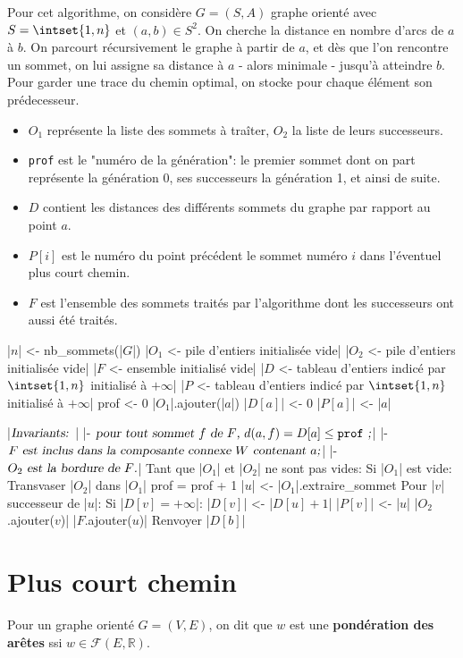 \documentclass{scrartcl}
\begin{document}
			Pour cet algorithme, on considère $G = (S,A)$ graphe orienté avec $S = \intset{1,n}$ et $(a,b)\in S^2$.
			On cherche la distance en nombre d'arcs de $a$ à $b$. 
			On parcourt récursivement le graphe à partir de $a$, et dès que l'on rencontre un sommet, 
			on lui assigne sa distance à $a$ - alors minimale - jusqu'à atteindre $b$.
			Pour garder une trace du chemin optimal, on stocke pour chaque élément son prédecesseur.
			\begin{itemize}
				\item $O_1$ représente la liste des sommets à traîter, $O_2$ la liste de leurs successeurs.
				\item \texttt{prof} est le "numéro de la génération": le premier sommet dont on part représente la génération 0,
				ses successeurs la génération 1, et ainsi de suite.
				\item $D$ contient les distances des différents sommets du graphe par rapport au point $a$.
				\item $P[i]$ est le numéro du point précédent le sommet numéro $i$ dans l'éventuel plus court chemin.
				\item $F$ est l'ensemble des sommets traités par l'algorithme dont les successeurs ont aussi été traités.
			\end{itemize}

			\begin{algotext}
				|$n$| <- nb_sommets(|$G$|)
				|$O_1$ <- pile d'entiers initialisée vide|
				|$O_2$ <- pile d'entiers initialisée vide|
				|$F$ <- ensemble initialisé vide|
				|$D$ <- tableau d'entiers indicé par $\intset{1,n}$ initialisé à $+\infty$|
				|$P$ <- tableau d'entiers indicé par $\intset{1,n}$ initialisé à $+\infty$|
				prof <- 0
				|$O_1$|.ajouter(|$a$|)	
				|$D[a]$| <- 0
				|$P[a]$| <- |$a$|

				|$\textsl{Invariants: }$|
					|- $ \textsl{pour tout sommet $f$ de $F$, $d(a,f) = D[a] \leq \mathtt{prof}$ ;}$|
					|- $ \textsl{$F$ est inclus dans la composante connexe $W$ contenant $a$;}$|
					|- $ \textsl{$O_2$ est la bordure de $F$.}$|
				Tant que |$O_1$| et |$O_2$| ne sont pas vides:
					Si |$O_1$| est vide:
						Transvaser |$O_2$| dans |$O_1$|
						prof = prof + 1
					|$u$| <- |$O_1$|.extraire_sommet
					Pour |$v$| successeur de |$u$|:
						Si |$D[v] = +\infty$|:
							|$D[v]$| <- |$D[u] + 1$|
							|$P[v]$| <- |$u$|
							|$O_2$.ajouter($v$)|
					|$F$.ajouter($u$)|
				Renvoyer |$D[b]$|
			\end{algotext}
			
	\section{Plus court chemin}
		 Pour un graphe orienté $G = (V,E)$, on dit que $w$ est une \textbf{pondération des arêtes}		
		ssi $w \in \mathcal{F}(E,\mathbb{R})$.
\end{document}
